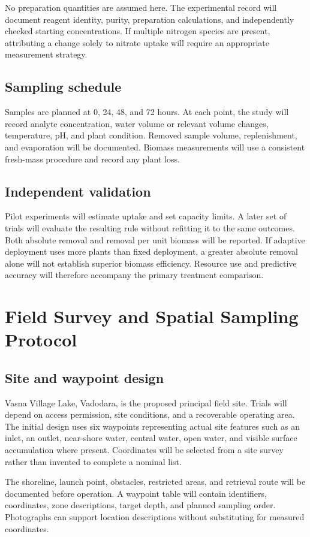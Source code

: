 \documentclass[12pt,a4paper]{article}
\newcommand{\papersection}[1]{\clearpage\section{#1}}
\begin{document}
No preparation quantities are assumed here. The experimental record will document reagent identity, purity, preparation calculations, and independently checked starting concentrations. If multiple nitrogen species are present, attributing a change solely to nitrate uptake will require an appropriate measurement strategy.

\subsection{Sampling schedule}
Samples are planned at 0, 24, 48, and 72 hours. At each point, the study will record analyte concentration, water volume or relevant volume changes, temperature, pH, and plant condition. Removed sample volume, replenishment, and evaporation will be documented. Biomass measurements will use a consistent fresh-mass procedure and record any plant loss.

\subsection{Independent validation}
Pilot experiments will estimate uptake and set capacity limits. A later set of trials will evaluate the resulting rule without refitting it to the same outcomes. Both absolute removal and removal per unit biomass will be reported. If adaptive deployment uses more plants than fixed deployment, a greater absolute removal alone will not establish superior biomass efficiency. Resource use and predictive accuracy will therefore accompany the primary treatment comparison.

\papersection{Field Survey and Spatial Sampling Protocol}
\subsection{Site and waypoint design}
Vasna Village Lake, Vadodara, is the proposed principal field site. Trials will depend on access permission, site conditions, and a recoverable operating area. The initial design uses six waypoints representing actual site features such as an inlet, an outlet, near-shore water, central water, open water, and visible surface accumulation where present. Coordinates will be selected from a site survey rather than invented to complete a nominal list.

The shoreline, launch point, obstacles, restricted areas, and retrieval route will be documented before operation. A waypoint table will contain identifiers, coordinates, zone descriptions, target depth, and planned sampling order. Photographs can support location descriptions without substituting for measured coordinates.
\end{document}
